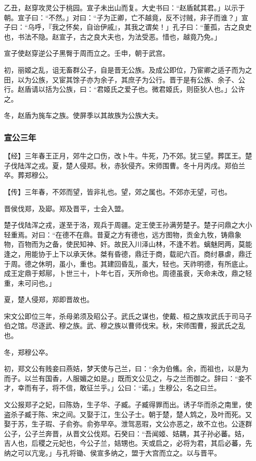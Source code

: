 \documentclass[]{article}
\begin{document}
乙丑，赵穿攻灵公于桃园。宣子未出山而复。大史书曰：``赵盾弑其君。」以示于朝。宣子曰：``不然。」对曰：``子为正卿，亡不越竟，反不讨贼，非子而谁？」宣子曰：``乌呼，『我之怀矣，自诒伊戚』，其我之谓矣！」孔子曰：``董孤，古之良史也，书法不隐。赵宣子，古之良大夫也，为法受恶。惜也，越竟乃免。」

宣子使赵穿逆公子黑臀于周而立之。壬申，朝于武宫。

初，丽姬之乱，诅无畜群公子，自是晋无公族。及成公即位，乃宦卿之适子而为之田，以为公族，又宦其馀子亦为余子，其庶子为公行。晋于是有公族、余子、公行。赵盾请以括为公族，曰：``君姬氏之爱子也。微君姬氏，则臣狄人也。」公许之。

冬，赵盾为旄车之族。使屏季以其故族为公族大夫。

\hypertarget{header-n1322}{%
\subsubsection{宣公三年}\label{header-n1322}}

【经】三年春王正月，郊牛之口伤，改卜牛。牛死，乃不郊。犹三望。葬匡王。楚子伐陆浑之戎。夏，楚人侵郑。秋，赤狄侵齐。宋师围曹。冬十月丙戌。郑伯兰卒。葬郑穆公。

【传】三年春，不郊而望，皆非礼也。望，郊之属也。不郊亦无望，可也。

晋侯伐郑，及郔。郑及晋平，士会入盟。

楚子伐陆浑之戎，遂至于洛，观兵于周疆。定王使王孙满劳楚子。楚子问鼎之大小轻重焉。对曰：``在德不在鼎。昔夏之方有德也，远方图物，贡金九牧，铸鼎象物，百物而为之备，使民知神、奸。故民入川泽山林，不逢不若。螭魅罔两，莫能逢之，用能协于上下以承天休。桀有昏德，鼎迁于商，载祀六百。商纣暴虐，鼎迁于周。德之休明，虽小，重也。其建回昏乱，虽大，轻也。天祚明德，有所底止。成王定鼎于郏鄏，卜世三十，卜年七百，天所命也。周德虽衰，天命未改，鼎之轻重，未可问也。」

夏，楚人侵郑，郑即晋故也。

宋文公即位三年，杀母弟须及昭公子。武氏之谋也，使戴、桓之族攻武氏于司马子伯之馆。尽逐武、穆之族。武、穆之族以曹师伐宋。秋，宋师围曹，报武氏之乱也。

冬，郑穆公卒。

初，郑文公有贱妾曰燕姞，梦天使与己兰，曰：``余为伯鯈。余，而祖也，以是为而子。以兰有国香，人服媚之如是。」既而文公见之，与之兰而御之。辞曰：``妾不才，幸而有子，将不信，敢征兰乎。」公曰：``诺。」生穆公，名之曰兰。

文公报郑子之妃，曰陈妫，生子华、子臧。子臧得罪而出。诱子华而杀之南里，使盗杀子臧于陈、宋之间。又娶于江，生公子士。朝于楚，楚人鸩之，及叶而死。又娶于苏，生子瑕、子俞弥。俞弥早卒。泄驾恶瑕，文公亦恶之，故不立也。公逐群公子，公子兰奔晋，从晋文公伐郑。石癸曰：``吾闻姬、姞耦，其子孙必蕃。姞，吉人也，后稷之元妃也，今公子兰，姞甥也。天或启之，必将为君，其后必蕃，先纳之可以亢宠。」与孔将锄、侯宣多纳之，盟于大宫而立之。以与晋平。
\end{document}
